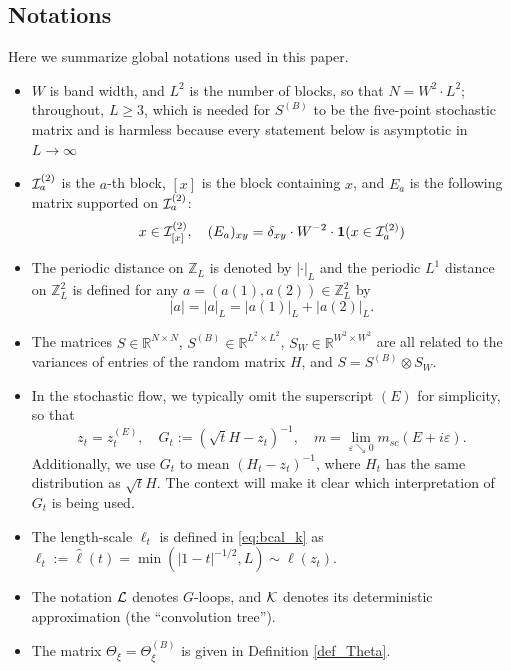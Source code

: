  

 



 



\subsection{Notations}
Here we summarize  global notations used in this paper. 
\begin{itemize}
    \item $W$ is band width, and $L^{2}$ is the number of blocks, so that $N=W^{2}\cdot L^{2}$;
    throughout, $L\geq3$, which is needed for $S^{(B)}$ to be the five-point stochastic matrix
    and is harmless because every statement below is asymptotic in $L\to\infty$
    \item ${\cal I}^{(2)}_a$ is the $a$-th block, $[x]$ is the block containing $x$, and $E_a$ is the following matrix supported on ${\cal I}^{(2)}_a$: 
    $$
    x\in {\cal I}^{(2)}_{[x]}, \quad (E_a)_{xy}=\delta_{xy}\cdot W^{-2}\cdot {\bf 1}(x\in {\cal I}^{(2)}_a)$$
    \item The periodic distance on $\mathbb{Z}_L$ is denoted by $|\cdot|_L$ and the periodic $L^1$ distance on $\mathbb{Z}_L^2$ is defined for any $a = (a(1), a(2))\in\mathbb{Z}_L^2$ by
    $$
    |a| = |a|_L = |a(1)|_L + |a(2)|_L.
    $$
    
    \item The matrices $S\in \mathbb R^{N\times N}$, $S^{(B)}\in \mathbb R^{L^{2}\times L^{2}}$, $S_W\in \mathbb R^{W^{2}\times W^{2}}$ are all related to the variances of entries of the random matrix $H$, and $S= S^{(B)}\otimes S_{W}$.
\item In the stochastic flow, we typically omit the superscript $(E)$ for simplicity, so that
\[
z_t = z_t^{(E)}, \quad G_t := (\sqrt{t} H - z_t)^{-1}, \quad m = \lim_{\varepsilon \searrow 0} m_{sc}(E + i \varepsilon).
\]
Additionally, we use $G_t$ to mean $(H_t - z_t)^{-1}$, where $H_t$ has the same distribution as $\sqrt{t} H$. The context will make it clear which interpretation of $G_t$ is being used.
\item The length-scale $\ell_t$ is defined in \eqref{eq:bcal_k} as $\ell_t:=\hat \ell(t)=\min(|1-t|^{-1/2}, L)\sim\ell(z_{t})$.

    \item The notation $\cal L$ denotes $G$-loops, and $\cal K$ denotes its deterministic approximation (the ``convolution tree'').

    \item The matrix $\Theta_\xi = \Theta^{(B)}_{\xi}$ is given in Definition \ref{def_Theta}.


\end{itemize}
